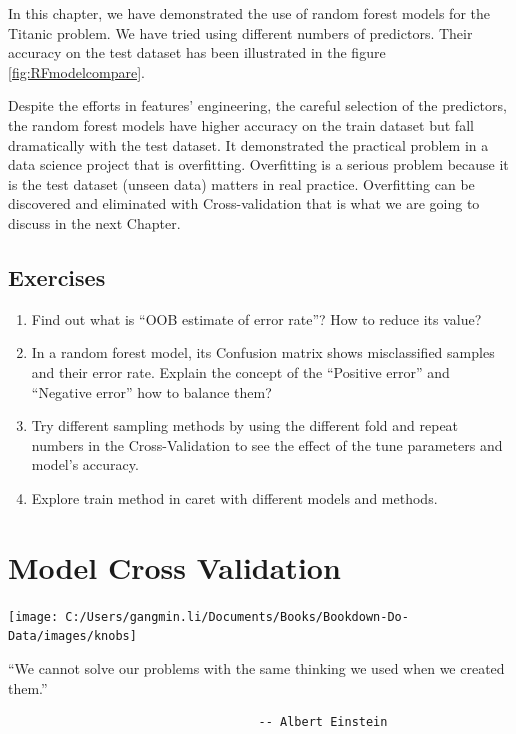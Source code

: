 \documentclass[
]{book}
\renewenvironment{quote}{\begin{VF}}{\end{VF}}
\begin{document}
In this chapter, we have demonstrated the use of random forest models for the Titanic problem. We have tried using different numbers of predictors. Their accuracy on the test dataset has been illustrated in the figure \ref{fig:RFmodelcompare}.

Despite the efforts in features' engineering, the careful selection of the predictors, the random forest models have higher accuracy on the train dataset but fall dramatically with the test dataset. It demonstrated the practical problem in a data science project that is overfitting. Overfitting is a serious problem because it is the test dataset (unseen data) matters in real practice. Overfitting can be discovered and eliminated with Cross-validation that is what we are going to discuss in the next Chapter.

\hypertarget{exercises-6}{%
\section*{Exercises}\label{exercises-6}}


\begin{enumerate}
\def\labelenumi{\arabic{enumi}.}
\item
  Find out what is ``OOB estimate of error rate''? How to reduce its value?
\item
  In a random forest model, its Confusion matrix shows misclassified samples and their error rate. Explain the concept of the ``Positive error'' and ``Negative error'' how to balance them?
\item
  Try different sampling methods by using the different fold and repeat numbers in the Cross-Validation to see the effect of the tune parameters and model's accuracy.
\item
  Explore train method in caret with different models and methods.
\end{enumerate}

\hypertarget{model-cross-validation}{%
\chapter{Model Cross Validation}\label{model-cross-validation}}

\begin{center}\texttt{[image: C:/Users/gangmin.li/Documents/Books/Bookdown-Do-Data/images/knobs]} \end{center}

\begin{quote}
``We cannot solve our problems with the same thinking we used
when we created them.''

\begin{verbatim}
                                   -- Albert Einstein
\end{verbatim}
\end{quote}
\end{document}
